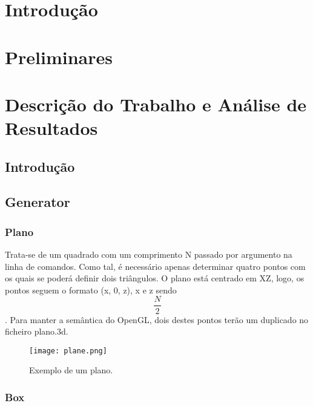 \documentclass[a4paper]{article}
\begin{document}
\section{Introdução}


\section{Preliminares}


\section{Descrição do Trabalho e Análise de Resultados}

\subsection{Introdução}



\subsection{Generator}

\subsubsection{Plano} %

\hspace{3mm} Trata-se de um quadrado com um comprimento N passado por argumento na linha de comandos. Como tal, é necessário apenas determinar quatro pontos com os quais se poderá definir dois triângulos. O plano está centrado em XZ, logo, os pontos seguem o formato (x, 0, z), x e z sendo \pm \[\frac{N}{2}\]. Para manter a semântica do OpenGL, dois destes pontos terão um duplicado no ficheiro plano.3d. %

\begin{figure}[h!]
\centering
\texttt{[image: plane.png]}
\caption{Exemplo de um plano.}
\label{fig:plane}
\end{figure}

\subsubsection{Box} %
\end{document}
